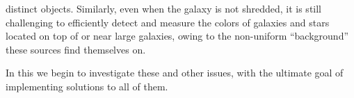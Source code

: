 \begin{itemize*}
{  distinct objects.  Similarly, even when the galaxy is not shredded, it is
  still challenging to efficiently detect and measure the colors of galaxies and
  stars located on top of or near large galaxies, owing to the non-uniform
  ``background'' these sources find themselves on.}
\end{itemize*}

\noindent In this \tnote{} we begin to investigate these and other issues, with
the ultimate goal of implementing solutions to all of them.

